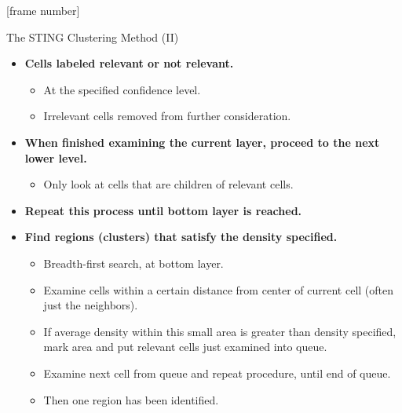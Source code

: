 \documentclass[aspectratio=169,t,xcolor=dvipsnames]{beamer}
\begin{document}
  {
    [frame number]
    \begin{frame}{The STING Clustering Method (II)}
      \begin{itemize}
        \item \textbf{Cells labeled relevant or not relevant.}
        \begin{itemize}
          \item At the specified confidence level.
          \item Irrelevant cells removed from further consideration.
        \end{itemize}
        \item \textbf{When finished examining the current layer, proceed to the next lower level.}
        \begin{itemize}
          \item Only look at cells that are children of relevant cells.
        \end{itemize}
        \item \textbf{Repeat this process until bottom layer is reached.}
        \item \textbf{Find regions (clusters) that satisfy the {\color{airforceblue}density} specified.}
        \begin{itemize}
          \item Breadth-first search, at bottom layer.
          \item Examine cells within a certain distance from center of current cell (often just the neighbors).
          \item If average density within this small area is greater than density specified, mark area and put relevant cells just examined into queue.
          \item Examine next cell from queue and repeat procedure, until end of queue.
          \item Then one region has been identified.
        \end{itemize}
      \end{itemize}
    \end{frame}
  }
\end{document}
